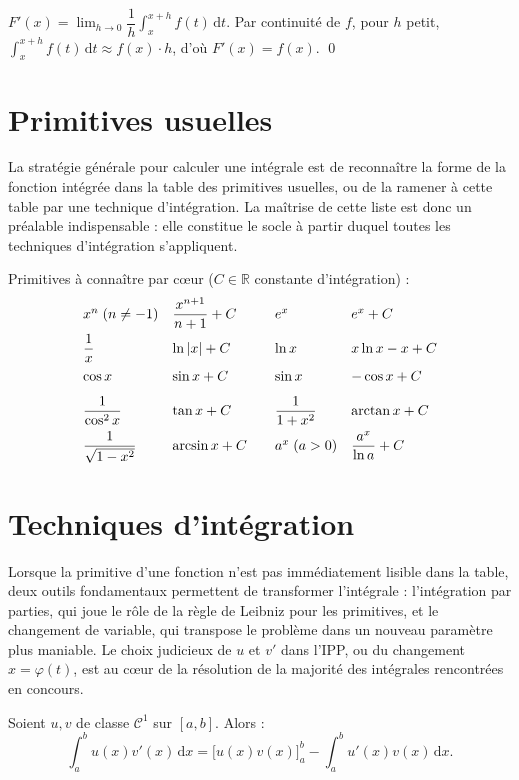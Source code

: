 \documentclass[11pt,a4paper,twoside]{book}
\newcommand{\R}{\mathbb{R}}
\begin{document}
\begin{preuvebox}
$F'(x) = \lim_{h\to0}\dfrac{1}{h}\displaystyle\int_x^{x+h}f(t)\,\mathrm{d}t$.
Par continuité de $f$, pour $h$ petit, $\displaystyle\int_x^{x+h}f(t)\,\mathrm{d}t \approx f(x)\cdot h$, d'où $F'(x)=f(x)$. \qed
\end{preuvebox}

\section{Primitives usuelles}

La stratégie générale pour calculer une intégrale est de reconnaître la forme de la fonction intégrée dans la table des primitives usuelles, ou de la ramener à cette table par une technique d'intégration. La maîtrise de cette liste est donc un préalable indispensable : elle constitue le socle à partir duquel toutes les techniques d'intégration s'appliquent.

\begin{retenirbox}
Primitives à connaître par cœur ($C \in \R$ constante d'intégration) :
\[
\begin{array}{ll@{\qquad}ll}
x^n \;(n\neq-1) & \dfrac{x^{n+1}}{n+1}+C &
e^x & e^x+C \\[8pt]
\dfrac{1}{x} & \ln|x|+C &
\ln x & x\ln x - x + C \\[8pt]
\cos x & \sin x+C &
\sin x & -\cos x+C \\[8pt]
\dfrac{1}{\cos^2 x} & \tan x+C &
\dfrac{1}{1+x^2} & \arctan x+C \\[8pt]
\dfrac{1}{\sqrt{1-x^2}} & \arcsin x+C &
a^x \;(a>0) & \dfrac{a^x}{\ln a}+C
\end{array}
\]
\end{retenirbox}

\section{Techniques d'intégration}

Lorsque la primitive d'une fonction n'est pas immédiatement lisible dans la table, deux outils fondamentaux permettent de transformer l'intégrale : l'intégration par parties, qui joue le rôle de la règle de Leibniz pour les primitives, et le changement de variable, qui transpose le problème dans un nouveau paramètre plus maniable. Le choix judicieux de $u$ et $v'$ dans l'IPP, ou du changement $x = \varphi(t)$, est au cœur de la résolution de la majorité des intégrales rencontrées en concours.

\begin{theoremebox}
Soient $u, v$ de classe $\mathcal{C}^1$ sur $[a,b]$. Alors :
\[
  \int_a^b u(x)v'(x)\,\mathrm{d}x = \big[u(x)v(x)\big]_a^b - \int_a^b u'(x)v(x)\,\mathrm{d}x.
\]
\end{theoremebox}
\end{document}
